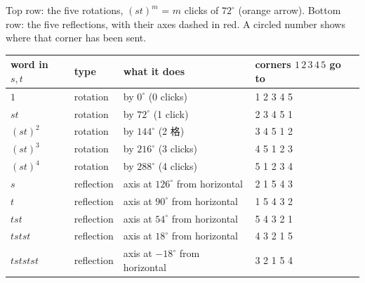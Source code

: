 \documentclass[10pt]{article}
\begin{document}
{\begin{minipage}[t]{744pt}
\par\vspace{2pt}
{\scriptsize Top row: the five rotations, $(st)^m$ = $m$ clicks of $72^\circ$ (orange arrow). Bottom row: the five reflections, with their axes dashed in red. A circled number shows where that corner has been sent.}\par\vspace{8pt}
\begin{minipage}[t]{380pt}\vspace{0pt}
\centering\small
\begin{tabular}{@{}llll@{}}
\toprule
word in $s,t$ & type & what it does & corners $1\,2\,3\,4\,5$ go to\\
\midrule
$1$ & rotation & by $0^\circ$ (0 clicks) & 1 2 3 4 5\\
$st$ & rotation & by $72^\circ$ (1 click) & 2 3 4 5 1\\
$(st)^2$ & rotation & by $144^\circ$ (2 格) & 3 4 5 1 2\\
$(st)^3$ & rotation & by $216^\circ$ (3 clicks) & 4 5 1 2 3\\
$(st)^4$ & rotation & by $288^\circ$ (4 clicks) & 5 1 2 3 4\\
\midrule
$s$ & reflection & axis at $126^\circ$ from horizontal & 2 1 5 4 3\\
$t$ & reflection & axis at $90^\circ$ from horizontal & 1 5 4 3 2\\
$tst$ & reflection & axis at $54^\circ$ from horizontal & 5 4 3 2 1\\
$tstst$ & reflection & axis at $18^\circ$ from horizontal & 4 3 2 1 5\\
$tststst$ & reflection & axis at $-18^\circ$ from horizontal & 3 2 1 5 4\\
\bottomrule
\end{tabular}
\end{minipage}\hfill
\begin{minipage}[t]{350pt}\vspace{0pt}
\raggedright
\begin{why}

\end{why}
\end{minipage}
\end{minipage}}
\end{document}
